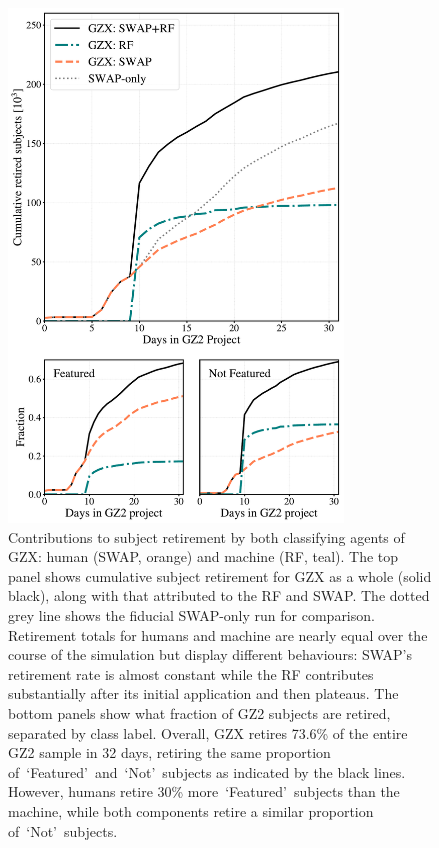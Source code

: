 \documentclass[twocolumn,  trackchanges, ]{aastex6}%
\newcommand{\feat}{`Featured'}
\newcommand{\notfeat}{`Not'}
\begin{document}
\begin{figure}[t!]
\includegraphics[width=3.5in]{f11.pdf}
\caption{Contributions to subject retirement by both classifying agents of GZX: human (SWAP, orange) and machine (RF, teal). The top panel shows cumulative subject retirement for GZX as a whole (solid black), along with that attributed to the RF and SWAP. The dotted grey line shows the fiducial SWAP-only run for comparison. Retirement totals for humans and machine are nearly equal over the course of the simulation but display different behaviours: SWAP's retirement rate is almost constant while the RF contributes substantially after its initial application and then plateaus.  The bottom panels show what fraction of GZ2 subjects are retired, separated by class label. Overall, GZX retires 73.6\% of the entire GZ2 sample in 32 days, retiring the same proportion of~\feat~and~\notfeat~subjects as indicated by the black lines. However, humans retire 30\% more~\feat~subjects than the machine, while both components retire a similar proportion of~\notfeat~subjects. \label{fig: gzx components}}
\end{figure}
\end{document}
